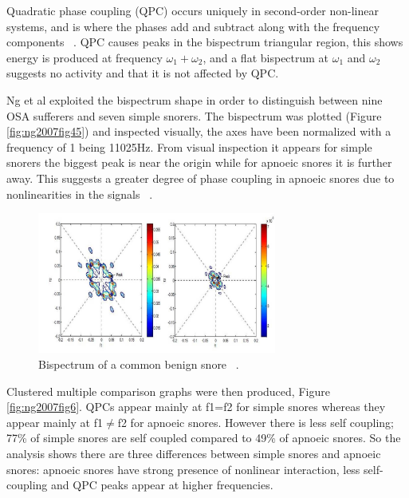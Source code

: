 Quadratic phase coupling (QPC) occurs uniquely in second-order non-linear systems, and is where the phases add and subtract along with the frequency components ~\cite{rastogi2005quadratic}. QPC causes peaks in the bispectrum triangular region, this shows energy is produced at frequency $\omega_1 + \omega_2$, and a flat bispectrum at $\omega_1$ and $\omega_2$ suggests no activity and that it is not affected by QPC. 

Ng et al exploited the bispectrum shape in order to distinguish between nine OSA sufferers and seven simple snorers. The bispectrum was plotted (Figure \ref{fig:ng2007fig45}) and inspected visually, the axes have been normalized with a frequency of 1 being 11025Hz. From visual inspection it appears for simple snorers the biggest peak is near the origin while for apnoeic snores it is further away. This suggests a greater degree of phase coupling in apnoeic snores due to nonlinearities in the signals ~\cite{ng2007bispectral}.

\begin{figure}[h]
\centering 
\includegraphics[width=0.7\textwidth]{drawings/ng2007fig45}
\caption{Bispectrum of a common benign snore ~\cite{ng2007bispectral}.}
\label{fig:ng2007fig45 }
\end{figure}

Clustered multiple comparison graphs were then produced, Figure \ref{fig:ng2007fig6}. QPCs appear mainly at f1=f2 for simple snores whereas they appear mainly at f1$\neq$f2 for apnoeic snores. However there is less self coupling; 77\% of simple snores are self coupled compared to 49\% of apnoeic snores. So the analysis shows there are three differences between simple snores and apnoeic snores: apnoeic snores have strong presence of nonlinear interaction, less self-coupling and QPC peaks appear at higher frequencies. 

